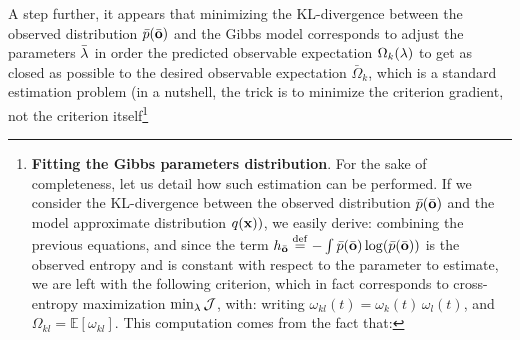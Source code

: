 A step further, it appears that minimizing the KL-divergence between the observed distribution $\bar{p}(\bar{\bf o})$ and the Gibbs model corresponds to adjust the parameters $\bar{\bf \lambda}$ in order the predicted observable expectation $\Omega_k({\bf \lambda})$ to get as closed as possible to the desired observable expectation $\bar{\Omega}_{k}$, which is a standard estimation problem (in a nutshell, the trick is to minimize the criterion gradient, not the criterion itself\footnote{{\bf Fitting the Gibbs parameters distribution}. For the sake of completeness, let us detail how such estimation can be performed. If we consider the KL-divergence between the observed distribution $\bar{p}(\bar{\bf o})$ and the model approximate distribution $q({\bf x}))$, we easily derive: 
combining the previous equations, and since the term $h_{\bar{\bf o}} \stackrel {\rm def}{=} -\int \bar{p}(\bar{\bf o}) \log(\bar{p}(\bar{\bf o}))$ is the observed entropy and is constant with respect to the parameter to estimate, we are left with the following criterion, which in fact corresponds to cross-entropy maximization $\min_{\bf \lambda} {\cal J}$, with: 
writing $\omega_{kl}(t) = \omega_k(t) \, \omega_l(t)$, and $\Omega_{kl} = {\mathbb E}[\omega_{kl}]$. This computation comes from the fact that:
}
